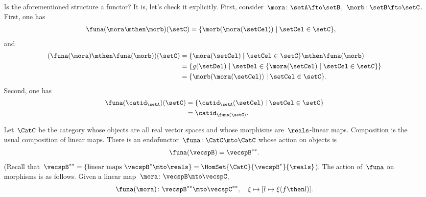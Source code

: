 \begin{example}
	Is the aforementioned structure a functor?
	It is, let's check it explicitly.
	First, consider~$\mora\colon \setA\fto \setB$,~$\morb\colon \setB \fto \setC$.
	First, one has
	\begin{equation*}
		\begin{aligned}
			\funa(\mora\mthen \morb)(\setC) & =\{ \morb(\mora(\setCel))\mid \setCel \in \setC\},
		\end{aligned}
	\end{equation*}
	and
	\begin{equation*}
		\begin{aligned}
			(\funa(\mora)\mthen \funa(\morb))(\setC)
			 & =\{ \mora(\setCel) \mid \setCel \in \setC\}\mthen \funa(\morb)          \\
			 & =\{g(\setDel)\mid \setDel \in \{\mora(\setCel)\mid \setCel\in \setC\}\} \\
			 & =\{ \morb(\mora(\setCel))\mid \setCel \in \setC\}.
		\end{aligned}
	\end{equation*}
	Second, one has
	\begin{equation*}
		\begin{aligned}
			\funa(\catid_\setA)(\setC) & = \{\catid_\setA(\setCel)\mid \setCel \in \setC\} \\
			                           & =\catid_{\funa(\setC)}.
		\end{aligned}
	\end{equation*}
\end{example}

\begin{example}
	\label{exa:double-dual-functor}
	Let~$\CatC$ be the category whose objects are all real vector spaces and whose morphisms are~$\reals$-linear maps.
	Composition is the usual composition of linear maps.
	There is an endofunctor~$\funa \colon \CatC \mto \CatC$ whose action on objects is
	\begin{equation}
		\funa ( \vecspB ) = \vecspB^{**}.
	\end{equation}
	(Recall that~$\vecspB^{**} = \{ \text{linear maps } \vecspB^* \mto \reals \} =  \HomSet{\CatC}{\vecspB^*}{\reals}$).
	The action of~$\funa$ on morphisms is as follows.
	Given a linear map~$\mora \colon \vecspB \mto \vecspC$,
	\begin{equation}
		\funa ( \mora ) \colon \vecspB^{**} \mto \vecspC^{**}, \quad \xi \mapsto [ l \mapsto \xi (f \then l)].
	\end{equation}
\end{example}

